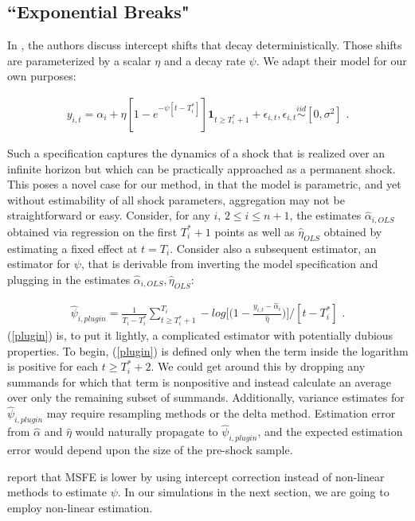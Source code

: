 \documentclass{uiucthesis2021}
\newcommand{\simiid}{\stackrel{iid}{\sim}} %
\theoremstyle{definition}
\begin{document}
\subsection{``Exponential Breaks"}
In \cite{castle2011forecasting}, the authors discuss intercept shifts that decay deterministically.  Those shifts are parameterized by a scalar $\eta$ and a decay rate $\psi$.  We adapt their model for our own purposes:

\begin{align}
y_{i,t} = \alpha_{i} + \eta[1 - e^{-\psi[t-T_{i}^{*}]}]\textbf{1}_{t\geq T_{i}^{*}+1} + \epsilon_{i,t}, \epsilon_{i,t} \simiid [0,\sigma^{2}] \text{ .}\label{decay_model}
\end{align}

Such a specification captures the dynamics of a shock that is realized over an infinite horizon but which can be practically approached as a permanent shock.  This poses a novel case for our method, in that the model is parametric, and yet without estimability of all shock parameters, aggregation may not be straightforward or easy.  Consider, for any $i$, $2 \leq i \leq n+1$, the estimates $\hat\alpha_{i,OLS}$  obtained via regression on the first $T_{i}^{*}+1$ points as well as $\hat\eta_{OLS}$ obtained by estimating a fixed effect at $t=T_{i}$.  Consider also a subsequent estimator, an estimator for $\psi$, that is derivable from inverting the model specification and plugging in the estimates  $\hat\alpha_{i,OLS},\hat\eta_{OLS}$:

\begin{align}
\hat\psi_{i,plugin} = \frac{1}{T_{i}-T_{i}^{*}}\sum^{T_{i}}_{t\geq T_{i}^{*}+1}-log{\big[\big(1-\frac{y_{i,t}-\hat\alpha_{i}}{\hat\eta}\big)\big]} / [t-T_{i}^{*}]\text{ .}\label{plugin}
\end{align}
(\ref{plugin}) is, to put it lightly, a complicated estimator with potentially dubious properties.  To begin, (\ref{plugin}) is defined only when the term inside the logarithm is positive for each $t\geq T^{*}_{i}+2$.  We could get around this by dropping any summands for which that term is nonpositive and instead calculate an average over only the remaining subset of summands.  Additionally, variance estimates for $\hat\psi_{i,plugin}$ may require resampling methods or the delta method.  Estimation error from $\hat\alpha$ and $\hat\eta$ would naturally propagate to $\hat\psi_{i,plugin}$, and the expected estimation error would depend upon the size of the pre-shock sample.

\cite{castle2011forecasting} report that MSFE is lower by using intercept correction instead of non-linear methods to estimate $\psi$.  In our simulations in the next section, we are going to employ non-linear estimation.
\end{document}
